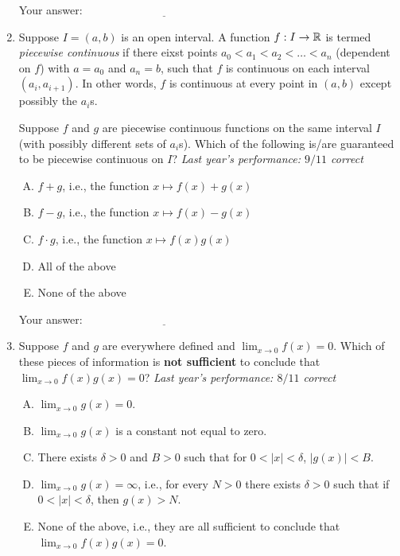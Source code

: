 \documentclass[10pt]{amsart}
\begin{document}
\begin{enumerate}
  \vspace{0.1in}
  Your answer: $\underline{\qquad\qquad\qquad\qquad\qquad\qquad\qquad}$
  \vspace{0.5in}

\item Suppose $I = (a,b)$ is an open interval. A function $f:I \to \mathbb{R}$
  is termed {\em piecewise continuous} if there eixst points $a_0 <
  a_1 < a_2 < \dots < a_n$ (dependent on $f$) with $a = a_0$ and $a_n
  = b$, such that $f$ is continuous on each interval $(a_i,
  a_{i+1})$. In other words, $f$ is continuous at every point in
  $(a,b)$ except possibly the $a_i$s.

  Suppose $f$ and $g$ are piecewise continuous functions on the same
  interval $I$ (with possibly different sets of $a_i$s). Which of the
  following is/are guaranteed to be piecewise continuous on $I$? {\em
  Last year's performance: $9/11$ correct}

  \begin{enumerate}[(A)]
  \item $f + g$, i.e., the function $x \mapsto f(x) + g(x)$
  \item $f - g$, i.e., the function $x \mapsto f(x) - g(x)$
  \item $f \cdot g$, i.e., the function $x \mapsto f(x)g(x)$
  \item All of the above
  \item None of the above
  \end{enumerate}

  \vspace{0.1in}
  Your answer: $\underline{\qquad\qquad\qquad\qquad\qquad\qquad\qquad}$
  \vspace{0.5in}

\item Suppose $f$ and $g$ are everywhere defined and $\lim_{x \to 0}
  f(x) = 0$. Which of these pieces of information is {\bf not
  sufficient} to conclude that $\lim_{x \to 0} f(x)g(x) = 0$? {\em
  Last year's performance: $8/11$ correct}

  \begin{enumerate}[(A)]
  \item $\lim_{x \to 0} g(x) = 0$.
  \item $\lim_{x \to 0} g(x)$ is a constant not equal to zero.
  \item There exists $\delta > 0$ and $B > 0$ such that for $0 < |x| <
    \delta$, $|g(x)| < B$.
  \item $\lim_{x \to 0} g(x) = \infty$, i.e., for every $N > 0$ there
    exists $\delta > 0$ such that if $0 < |x| < \delta$, then $g(x) >
    N$.
  \item None of the above, i.e., they are all sufficient to conclude
    that $\lim_{x \to 0} f(x)g(x) = 0$.
  \end{enumerate}


\end{enumerate}
\end{document}
